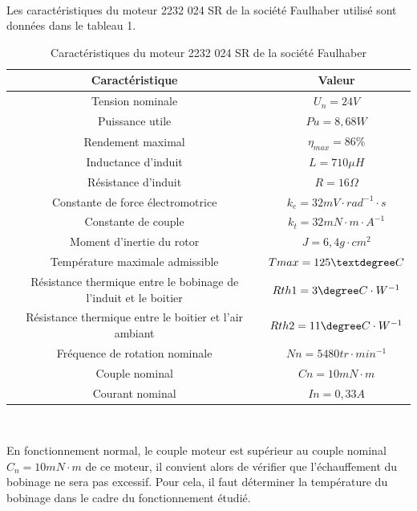 ~\

Les caractéristiques du moteur 2232 024 SR de la société Faulhaber utilisé sont données dans le tableau 1.

\begin{table}
\begin{center}
\begin{tabular}{|c|c|}
\hline
Caractéristique & Valeur \\
\hline
Tension nominale & $U_n = 24V$ \\
\hline
Puissance utile & $Pu = 8,68W$ \\
\hline
Rendement maximal & $\eta_{max} = 86\%$ \\
\hline
Inductance d'induit & $L = 710 \mu H$ \\
\hline
Résistance d'induit & $R = 16\Omega$ \\
\hline
Constante de force électromotrice & $k_e = 32 mV\cdot rad^{-1}\cdot s$ \\
\hline
Constante de couple & $k_t = 32 mN\cdot m\cdot A^{-1}$ \\
\hline
Moment d'inertie du rotor & $J = 6,4 g\cdot cm^2$ \\
\hline
Température maximale admissible & $Tmax = 125 \textdegree C$ \\
\hline
Résistance thermique entre le bobinage de l'induit et le boitier & $Rth1 = 3 \degree C\cdot W^{-1}$ \\
\hline
Résistance thermique entre le boitier et l'air ambiant & $Rth2 = 11 \degree C\cdot W^{-1}$ \\
\hline
Fréquence de rotation nominale & $Nn = 5 480 tr\cdot min^{-1}$ \\
\hline
Couple nominal & $Cn = 10 mN\cdot m$ \\
\hline
Courant nominal & $In = 0,33A$ \\
\hline
\end{tabular}
 \caption{Caractéristiques du moteur 2232 024 SR de la société Faulhaber}
 \label{tab01}
 \end{center}
\end{table}

\newpage


~\

En fonctionnement normal, le couple moteur est supérieur au couple nominal $C_n = 10mN\cdot m$ de ce moteur, il convient alors de vérifier que l'échauffement du bobinage ne sera pas excessif. Pour cela, il faut déterminer la température du bobinage dans le cadre du fonctionnement étudié.

